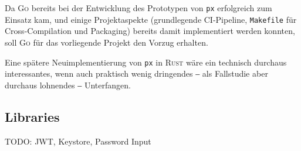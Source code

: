 Da \textsc{Go} bereits bei der Entwicklung des Prototypen von \texttt{px} erfolgreich zum Einsatz kam, und einige Projektaspekte (grundlegende CI-Pipeline, \texttt{Makefile} für Cross-Compilation und Packaging) bereits damit implementiert werden konnten, soll \textsc{Go} für das vorliegende Projekt den Vorzug erhalten.

Eine spätere Neuimplementierung von \texttt{px} in \textsc{Rust} wäre ein technisch durchaus interessantes, wenn auch praktisch wenig dringendes ‒ als Fallstudie aber durchaus lohnendes ‒ Unterfangen.

\subsection{Libraries}

TODO: JWT, Keystore, Password Input
